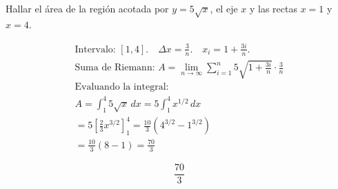 Hallar el área de la región acotada por $y=5\sqrt{x}$, el eje $x$ y las rectas $x=1$ y $x=4$.

\nopagebreak
\begin{align*}
\text{Intervalo: } [1,4]. \quad \Delta x = \frac{3}{n}. \quad x_i = 1 + \frac{3i}{n}. \\
\text{Suma de Riemann: } A = \lim_{n \to \infty} \sum_{i=1}^{n} 5\sqrt{1+\frac{3i}{n}} \cdot \frac{3}{n} \\
\text{Evaluando la integral:} \\
A = \int_{1}^{4} 5\sqrt{x} \, dx = 5 \int_{1}^{4} x^{1/2} \, dx \\
= 5 \left[ \frac{2}{3} x^{3/2} \right]_{1}^{4} = \frac{10}{3} (4^{3/2} - 1^{3/2}) \\
= \frac{10}{3} (8 - 1) = \frac{70}{3}
\end{align*}

\[
\boxed{\displaystyle \frac{70}{3}}
\]

